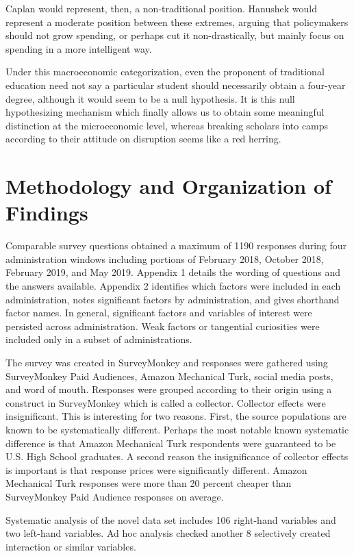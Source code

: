 \documentclass[AER]{/Users/zyl357/Documents/GitHub/research-dissertation-case-for-alt-ed/papers/alt-ed-survey/aea-latex-templates/AEA}
\begin{document}
Caplan would represent, then, a non-traditional position. Hanushek would
represent a moderate position between these extremes, arguing that
policymakers should not grow spending, or perhaps cut it non-drastically,
but mainly focus on spending in a more intelligent way.

Under this macroeconomic categorization, even the proponent of traditional
education need not say a particular student should necessarily obtain a
four-year degree, although it would seem to be a null hypothesis. It is
this null hypothesizing mechanism which finally allows us to obtain some
meaningful distinction at the microeconomic level, whereas breaking
scholars into camps according to their attitude on disruption seems like a
red herring.

\section{Methodology and Organization of Findings}

Comparable survey questions obtained a maximum of 1190 responses during
four administration windows including portions of February 2018, October
2018, February 2019, and May 2019. Appendix 1 details the wording of
questions and the answers available. Appendix 2 identifies which factors
were included in each administration, notes significant factors by
administration, and gives shorthand factor names. In general, significant
factors and variables of interest were persisted across administration.
Weak factors or tangential curiosities were included only in a subset of
administrations.

The survey was created in SurveyMonkey and responses were gathered using
SurveyMonkey Paid Audiences, Amazon Mechanical Turk, social media posts,
and word of mouth. Responses were grouped according to their origin using
a construct in SurveyMonkey which is called a collector. Collector effects
were insignificant. This is interesting for two reasons. First, the source
populations are known to be systematically different. Perhaps the most
notable known systematic difference is that Amazon Mechanical Turk
respondents were guaranteed to be U.S. High School graduates. A second
reason the insignificance of collector effects is important is that
response prices were significantly different. Amazon Mechanical Turk
responses were more than 20 percent cheaper than SurveyMonkey Paid Audience
responses on average.

Systematic analysis of the novel data set includes 106 right-hand
variables and two left-hand variables. Ad hoc analysis checked another 8
selectively created interaction or similar variables.
\end{document}

